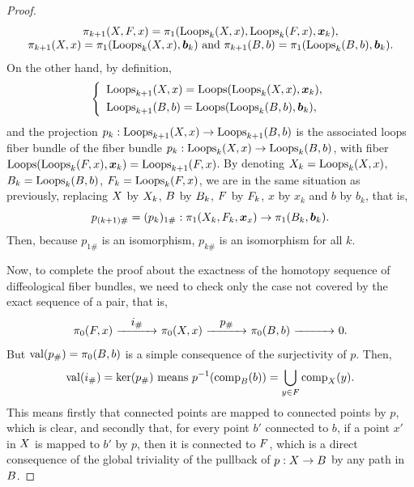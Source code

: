\begin{proof}
  \renewcommand{\arraystretch}{1.5}
  $$%
  \begin{array}{c}
    \pi_{k+1}(\X,\F,x) = \pi_1(\Loops_{k}(\X,x),\Loops_{k}(\F,x),\bmx_{k}), \\
    \pi_{k+1}(\X,x) = \pi_1(\Loops_{k}(\X,x),\bmb_{k}) \ \text{and} \ \pi_{k+1}(\B,b) = \pi_1(\Loops_{k}(\B,b),\bmb_{k}).
  \end{array}
  $$%
  \renewcommand{\arraystretch}{1}
  On the other hand,
  by definition,
  $$%
  \left\{
  \begin{array}{l}
    \Loops_{k+1}(\X,x) = \Loops(\Loops_k(\X,x),\bmx_k), \\[.8ex]
    \Loops_{k+1}(\B,b) =\Loops(\Loops_k(\B,b),\bmb_k),
  \end{array}
  \right.
  $$%
  and the projection $p_k : \operatorname{Loops}_{k+1}(X,x) \to \operatorname{Loops}_{k+1}(B,b)$ is the associated loops fiber bundle  of the fiber bundle $p_k : \operatorname{Loops}_k(X,x) \to \operatorname{Loops}_k(B,b)$,
  with fiber $\operatorname{Loops}(\operatorname{Loops}_{k}(F,x),{\boldsymbol x}_{k}) = \operatorname{Loops}_{k+1}(F,x)$.
  By denoting $X_k=\operatorname{Loops}_k(X,x)$, $B_k=\operatorname{Loops}_k(B,b)$,
  $F_k=\operatorname{Loops}_k(F,x)$,
  we are in the same situation as previously,
  replacing $X$ by $X_k$,
  $B$ by $B_k$,
  $F$ by $F_k$,
  $x$ by $x_k$ and $b$ by $b_k$,
  that is,
  $$%
  p_{(k+1)\#} = (p_k)_{1\#} : \pi_1(\X_k, \F_k, \bmx_x) \to \pi_1(\B_k,\bmb_k).
  $$%
  Then, because $p_{1\#}$ is an isomorphism,
  $p_{k\#}$ is an isomorphism for all $k$.
  
  Now, to complete the proof about the exactness of the homotopy sequence of diffeological fiber bundles,
  we need to check only the case not covered by the exact sequence of a pair,
  that is,
  $$%
  \pi_0(\F,x) \xrfl{i_\#}{15mm} \pi_0(\X,x) \xrfl{p_\#}{15mm} \pi_0(\B,b) \xrfl{}{15mm} 0.
  $$%
  But $\mathrm{val}(p_\#) = \pi_0(B,b)$ is a simple consequence of the surjectivity of $p$.
  Then,
  $$%
  \Val(i_\#) = \ker(p_\#) \ \text{means} \ p^{-1}(\comp_\B(b)) = \bigcup_{y \in \F} \comp_\X(y).
  $$%
  This means firstly that connected points are mapped to connected points by $p$,
  which is clear,
  and secondly that,
  for every point $b'$ connected to $b$,
  if a point $x'$ in $X$ is mapped to $b'$ by $p$,
  then it is connected to $F$,
  which is a direct consequence of the global triviality of the pullback of $p : X \to B$ by any path in $B$.
\end{proof}


